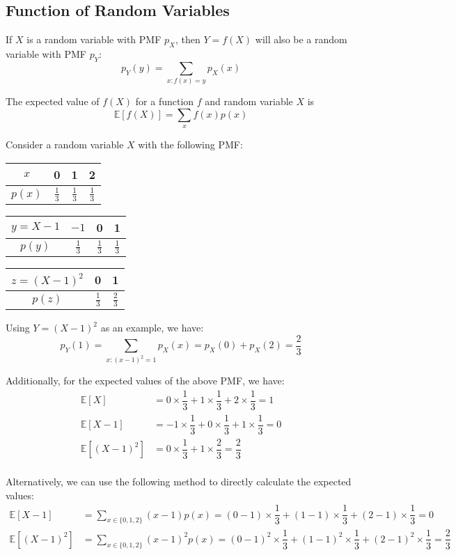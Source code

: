 \subsection{Function of Random Variables}
If \(X\) is a random variable with PMF \(p_X\), then \(Y = f(X)\) will also be a random variable with PMF \(p_Y\):
\[
  p_Y(y) = \sum_{x: f(x)=y} p_X(x)
\]

The expected value of \(f(X)\) for a function \(f\) and random variable \(X\) is 
\[
  \mathbb{E}[f(X)] = \sum_{x} f(x)p(x) 
\]

\begin{eg}
Consider a random variable \(X\) with the following PMF: 
\begin{center}
\begin{tabular}{c|c|c|c}
      \toprule
      \(x\)  & 0 & 1 & 2  \\
    \midrule
      \(p(x)\)  & \(\frac{1}{3}\) & \(\frac{1}{3}\) & \(\frac{1}{3}\)  \\
      \bottomrule
  \end{tabular}
  \quad\quad
  \begin{tabular}{c|c|c|c}
      \toprule
      \(y = X - 1\)  & \(-1\)  & 0 & 1  \\
    \midrule
      \(p(y)\)  & \(\frac{1}{3}\) & \(\frac{1}{3}\) & \(\frac{1}{3}\)  \\
      \bottomrule
\end{tabular}
\quad\quad
\begin{tabular}{c|c|c}
  \toprule
  \(z = (X - 1)^2\)  & 0 & 1  \\
\midrule
  \(p(z)\)  & \(\frac{1}{3}\) & \(\frac{2}{3}\)  \\
  \bottomrule
\end{tabular}
\end{center}

Using \(Y = (X - 1)^2\) as an example, we have: 
\[
  p_Y(1) = \sum_{x: (x - 1)^2=1} p_X(x) = p_X(0) + p_X(2) = \dfrac{2}{3}
\]

Additionally, for the expected values of the above PMF, we have: 
\[
\begin{aligned}
  \mathbb{E}[X] &= 0 \times \dfrac{1}{3} + 1 \times \dfrac{1}{3} + 2 \times \dfrac{1}{3} = 1 \\
  \mathbb{E}[X - 1] &= -1 \times \dfrac{1}{3} + 0 \times \dfrac{1}{3} + 1 \times \dfrac{1}{3} = 0 \\
  \mathbb{E}[(X - 1)^2] &= 0 \times \dfrac{1}{3} + 1 \times \dfrac{2}{3} = \dfrac{2}{3} \\
\end{aligned}
\]

Alternatively, we can use the following method to directly calculate the expected values:
\[
\begin{aligned}
  \mathbb{E}[X - 1] &= \sum_{x \in \{0, 1, 2\}}(x - 1)p(x) = (0 - 1) \times \dfrac{1}{3} + (1 - 1) \times \dfrac{1}{3} + (2 - 1) \times \dfrac{1}{3} = 0 \\
  \mathbb{E}[(X - 1)^2] &= \sum_{x \in \{0, 1, 2\}}(x - 1)^2 p(x) = (0 - 1)^2 \times \dfrac{1}{3} + (1 - 1)^2 \times \dfrac{1}{3} + (2 - 1)^2 \times \dfrac{1}{3} = \dfrac{2}{3}
\end{aligned}
\]

\end{eg}

